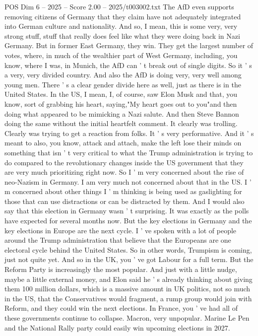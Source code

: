 \begin{textsample}{POS Dim 6 – 2025 – Score 2.00 – 2025/t003002.txt}
The AfD even supports removing citizens of Germany that they claim have not adequately integrated into German culture and nationality.
And so, I mean, this is some very, very strong stuff, stuff that really does feel like what they were doing back in Nazi Germany.
But in former East Germany, they win.
They get the largest number of votes, where, in much of the wealthier part of West Germany, including, you know, where I was, in Munich, the AfD can ' t break out of single digits.
So it ' s a very, very divided country.
And also the AfD is doing very, very well among young men.
There ' s a clear gender divide here as well, just as there is in the United States.
In the US, I mean, I, of course, saw Elon Musk and that, you know, sort of grabbing his heart, saying,"My heart goes out to you"and then doing what appeared to be mimicking a Nazi salute.
And then Steve Bannon doing the same without the initial heartfelt comment.
It clearly was trolling.
Clearly was trying to get a reaction from folks.
It ' s very performative.
And it ' s meant to also, you know, attack and attach, make the left lose their minds on something that isn ' t very critical to what the Trump administration is trying to do compared to the revolutionary changes inside the US government that they are very much prioritizing right now.
So I ' m very concerned about the rise of neo-Nazism in Germany.
I am very much not concerned about that in the US.
I ' m concerned about other things I ' m thinking is being used as gaslighting for those that can use distractions or can be distracted by them.
And I would also say that this election in Germany wasn ' t surprising.
It was exactly as the polls have expected for several months now.
But the key elections in Germany and the key elections in Europe are the next cycle.
I ' ve spoken with a lot of people around the Trump administration that believe that the Europeans are one electoral cycle behind the United States.
So in other words, Trumpism is coming, just not quite yet.
And so in the UK, you ' ve got Labour for a full term.
But the Reform Party is increasingly the most popular.
And just with a little nudge, maybe a little external money, and Elon said he ' s already thinking about giving them 100 million dollars, which is a massive amount in UK politics, not so much in the US, that the Conservatives would fragment, a rump group would join with Reform, and they could win the next elections.
In France, you ' ve had all of these governments continue to collapse.
Macron, very unpopular.
Marine Le Pen and the National Rally party could easily win upcoming elections in 2027.

\end{textsample}
